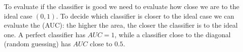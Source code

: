 To evaluate if the classifier is good we need to evaluate how close we are to the ideal case $(0,1)$. To decide which classifier is closer to the ideal case we can evaluate the  (AUC): the higher the area, the closer the classifier is to the ideal one. A perfect classifier has $AUC = 1$, while a classifier close to the diagonal (random guessing) has $AUC$ close to $0.5$.

